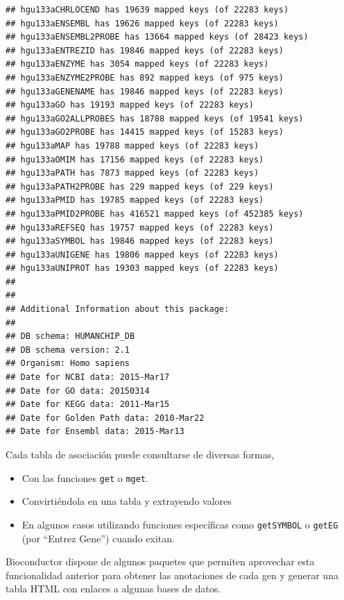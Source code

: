 \documentclass[a4paper]{article}\usepackage[]{graphicx}\usepackage[]{color}
\makeatletter
\newenvironment{kframe}{%
 \def\at@end@of@kframe{}%
 \ifinner\ifhmode%
  \def\at@end@of@kframe{\end{minipage}}%
  \begin{minipage}{\columnwidth}%
 \fi\fi%
 \def\FrameCommand##1{\hskip\@totalleftmargin \hskip-\fboxsep
 \colorbox{shadecolor}{##1}\hskip-\fboxsep
     \hskip-\linewidth \hskip-\@totalleftmargin \hskip\columnwidth}%
 \MakeFramed {\advance\hsize-\width
   \@totalleftmargin\z@ \linewidth\hsize
   \@setminipage}}%
 {\par\unskip\endMakeFramed%
 \at@end@of@kframe}
\newenvironment{knitrout}{}{} %
\makeatother
\begin{document}
\begin{knitrout}
\begin{kframe}
{\ttfamily\noindent\color{warningcolor}{\#\# Warning in (function () : hgu133aCHRLOCEND is deprecated. Please use an appropriate TxDb\\\#\#\ \  object or package for this kind of data.}}\begin{verbatim}
## hgu133aCHRLOCEND has 19639 mapped keys (of 22283 keys)
## hgu133aENSEMBL has 19626 mapped keys (of 22283 keys)
## hgu133aENSEMBL2PROBE has 13664 mapped keys (of 28423 keys)
## hgu133aENTREZID has 19846 mapped keys (of 22283 keys)
## hgu133aENZYME has 3054 mapped keys (of 22283 keys)
## hgu133aENZYME2PROBE has 892 mapped keys (of 975 keys)
## hgu133aGENENAME has 19846 mapped keys (of 22283 keys)
## hgu133aGO has 19193 mapped keys (of 22283 keys)
## hgu133aGO2ALLPROBES has 18788 mapped keys (of 19541 keys)
## hgu133aGO2PROBE has 14415 mapped keys (of 15283 keys)
## hgu133aMAP has 19788 mapped keys (of 22283 keys)
## hgu133aOMIM has 17156 mapped keys (of 22283 keys)
## hgu133aPATH has 7873 mapped keys (of 22283 keys)
## hgu133aPATH2PROBE has 229 mapped keys (of 229 keys)
## hgu133aPMID has 19785 mapped keys (of 22283 keys)
## hgu133aPMID2PROBE has 416521 mapped keys (of 452385 keys)
## hgu133aREFSEQ has 19757 mapped keys (of 22283 keys)
## hgu133aSYMBOL has 19846 mapped keys (of 22283 keys)
## hgu133aUNIGENE has 19806 mapped keys (of 22283 keys)
## hgu133aUNIPROT has 19303 mapped keys (of 22283 keys)
## 
## 
## Additional Information about this package:
## 
## DB schema: HUMANCHIP_DB
## DB schema version: 2.1
## Organism: Homo sapiens
## Date for NCBI data: 2015-Mar17
## Date for GO data: 20150314
## Date for KEGG data: 2011-Mar15
## Date for Golden Path data: 2010-Mar22
## Date for Ensembl data: 2015-Mar13
\end{verbatim}
\end{kframe}
\end{knitrout}

Cada tabla de asociación puede consultarse de diversas formas, 
\begin{itemize}
\item Con las funciones \texttt{get} o \texttt{mget}.
\item Convirtiéndola en una tabla y extrayendo valores
\item En algunos casos utilizando funciones específicas como \texttt{getSYMBOL} o \texttt{getEG} (por ``Entrez Gene'') cuando exitan.
\end{itemize}

Bioconductor dispone de algunos paquetes que permiten aprovechar esta funcionalidad anterior para obtener las anotaciones de cada gen y generar una tabla HTML con enlaces a algunas bases de datos.
\end{document}
